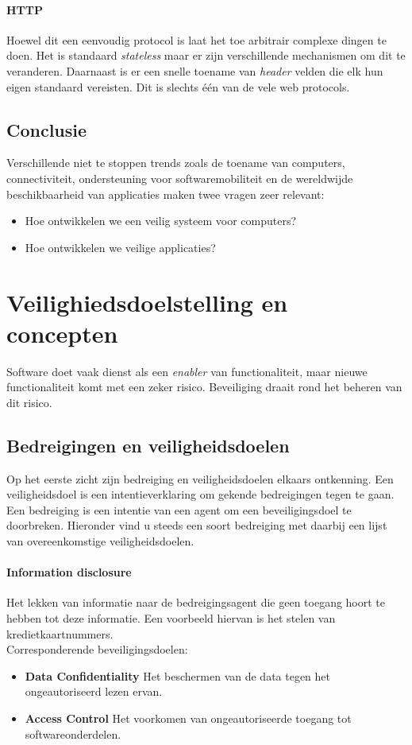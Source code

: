 \documentclass[../main.tex]{subfiles}
\begin{document}
\paragraph{HTTP} Hoewel dit een eenvoudig protocol is laat het toe arbitrair complexe dingen te doen. Het is standaard \textit{stateless} maar er zijn verschillende mechanismen om dit te veranderen. Daarnaast is er een snelle toename van \textit{header} velden die elk hun eigen standaard vereisten. Dit is slechts \'e\'en van de vele web protocols.

\subsection{Conclusie}
Verschillende niet te stoppen trends zoals de toename van computers, connectiviteit, ondersteuning voor softwaremobiliteit en de wereldwijde beschikbaarheid van applicaties maken twee vragen zeer relevant:
\begin{itemize}
	\item Hoe ontwikkelen we een veilig systeem voor computers?
	\item Hoe ontwikkelen we veilige applicaties?
\end{itemize}

\section{Veilighiedsdoelstelling en concepten}
Software doet vaak dienst als een \textit{enabler} van functionaliteit, maar nieuwe functionaliteit komt met een zeker risico. Beveiliging draait rond het beheren van dit risico.
\subsection{Bedreigingen en veiligheidsdoelen}
Op het eerste zicht zijn bedreiging en veiligheidsdoelen elkaars ontkenning.
Een veiligheidsdoel is een intentieverklaring om gekende bedreigingen tegen te gaan.
Een bedreiging is een intentie van een agent om een beveiligingsdoel te doorbreken.
Hieronder vind u steeds een soort bedreiging met daarbij een lijst van overeenkomstige veiligheidsdoelen.

\paragraph{Information disclosure} 
Het lekken van informatie naar de bedreigingsagent die geen toegang hoort te hebben tot deze informatie. Een voorbeeld hiervan is het stelen van kredietkaartnummers. 
\\
Corresponderende beveiligingsdoelen:
\begin{itemize}
	\item \textbf{Data Confidentiality} Het beschermen van de data tegen het ongeautoriseerd lezen ervan.
	\item \textbf{Access Control} Het voorkomen van ongeautoriseerde toegang tot softwareonderdelen.
\end{itemize}
\end{document}
